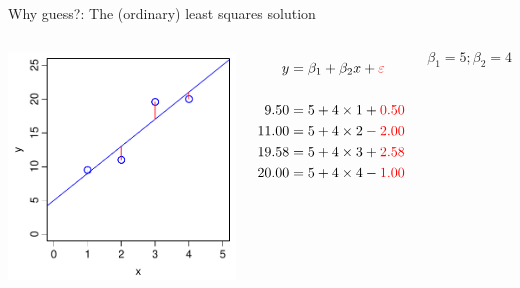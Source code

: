 \documentclass[xcolor=x11names,compress]{beamer}
\renewcommand{\(}{\begin{columns}}
\renewcommand{\)}{\end{columns}}
\newcommand{\<}[1]{\begin{column}{#1}}
\renewcommand{\>}{\end{column}}
\begin{document}
\begin{frame}{Why guess?: The (ordinary) least squares solution}

\begin{columns}[T]

		\includegraphics[width=\textwidth]{JustRight.pdf}
		
		\begin{align*}
		  y  &= \beta_1 + \beta_2 x  + {\color{red} \varepsilon }\\
		  \\
		  9.50  &= 5 + 4 \times 1 + {\color{red} 0.50}\\
		  11.00 &= 5 + 4 \times 2 - {\color{red} 2.00}\\
		  19.58 &= 5 + 4 \times 3 + {\color{red} 2.58}\\
		  20.00 &= 5 + 4 \times 4 - {\color{red} 1.00} 
		\end{align*}
		
		\[\beta_1 = 5; \beta_2=4\]
				
\end{columns}		
\end{frame}

\end{document}
